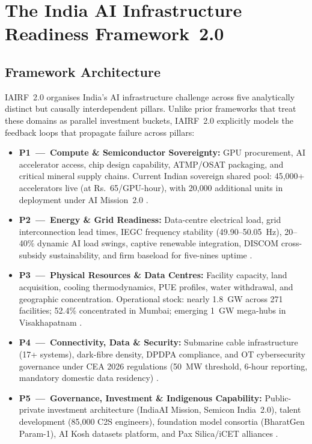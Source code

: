\documentclass[conference]{IEEEtran}
\begin{document}
\section{The India AI Infrastructure Readiness Framework~2.0}

\subsection{Framework Architecture}

IAIRF~2.0 organises India's AI infrastructure challenge across five analytically distinct but causally interdependent pillars. Unlike prior frameworks that treat these domains as parallel investment buckets, IAIRF~2.0 explicitly models the feedback loops that propagate failure across pillars:

\begin{itemize}[leftmargin=*, noitemsep, topsep=2pt]
  \item \textbf{P1~---~Compute \& Semiconductor Sovereignty:} GPU procurement, AI accelerator access, chip design capability, ATMP/OSAT packaging, and critical mineral supply chains. Current Indian sovereign shared pool: 45{,}000+ accelerators live (at Rs.~65/GPU-hour), with 20{,}000 additional units in deployment under AI Mission~2.0 \cite{eetimes2026aimission}.
  \item \textbf{P2~---~Energy \& Grid Readiness:} Data-centre electrical load, grid interconnection lead times, IEGC frequency stability (49.90--50.05~Hz), 20--40\% dynamic AI load swings, captive renewable integration, DISCOM cross-subsidy sustainability, and firm baseload for five-nines uptime \cite{fsr2026powergrid}.
  \item \textbf{P3~---~Physical Resources \& Data Centres:} Facility capacity, land acquisition, cooling thermodynamics, PUE profiles, water withdrawal, and geographic concentration. Operational stock: nearly 1.8~GW across 271 facilities; 52.4\% concentrated in Mumbai; emerging 1~GW mega-hubs in Visakhapatnam \cite{cushman2026h1,ceew2026datacentre}.
  \item \textbf{P4~---~Connectivity, Data \& Security:} Submarine cable infrastructure (17+ systems), dark-fibre density, DPDPA compliance, and OT cybersecurity governance under CEA 2026 regulations (50~MW threshold, 6-hour reporting, mandatory domestic data residency) \cite{cea2026cybersec,denexus2026otcyber}.
  \item \textbf{P5~---~Governance, Investment \& Indigenous Capability:} Public-private investment architecture (IndiaAI Mission, Semicon India~2.0), talent development (85{,}000 C2S engineers), foundation model consortia (BharatGen Param-1), AI Kosh datasets platform, and Pax Silica/iCET alliances \cite{dst2024bharatgen,pib2026semicon2}.
\end{itemize}
\end{document}
